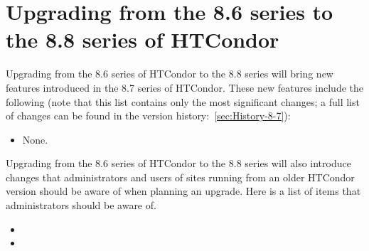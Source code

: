 \section{Upgrading from the 8.6 series to the 8.8 series of HTCondor}\label{sec:to-8.8}

Upgrading from the 8.6 series of HTCondor to the 8.8 series
will bring new features introduced in the 8.7 series of HTCondor.
These new features include the following (note that this list contains
only the most significant changes; a full list of changes can be
found in the version history:~\ref{sec:History-8-7}):

\begin{itemize}

\item None.

\end{itemize}

Upgrading from the 8.6 series of HTCondor to the 8.8 series will
also introduce changes that administrators and users of sites running
from an older HTCondor version should be aware of when planning an upgrade.
Here is a list of items that administrators should be aware of.

\begin{itemize}

\item

\item

\end{itemize}

